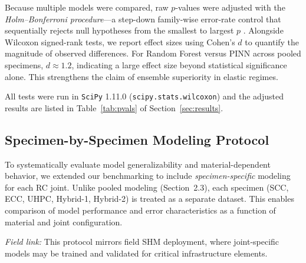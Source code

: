 \documentclass{article}
\begin{document}
Because multiple models were compared, raw $p$-values were adjusted
with the \emph{Holm–Bonferroni procedure}—a step-down family-wise
error-rate control that sequentially rejects null hypotheses from the
smallest to largest $p$ \citep{Holm1979}. Alongside Wilcoxon signed-rank
tests, we report effect sizes using Cohen’s $d$ to quantify the magnitude
of observed differences. For Random Forest versus PINN across pooled
specimens, $d \approx 1.2$, indicating a large effect size beyond
statistical significance alone. This strengthens the claim of ensemble
superiority in elastic regimes. 

All tests were run in
\texttt{SciPy} 1.11.0
(\texttt{scipy.stats.wilcoxon}) and the adjusted results are listed in
Table~\ref{tab:pvals} of Section~\ref{sec:results}.

		

\subsection{Specimen-by-Specimen Modeling Protocol}
To systematically evaluate model generalizability and material-dependent behavior, we extended our benchmarking to include \emph{specimen-specific} modeling for each RC joint. Unlike pooled modeling (Section~2.3), each specimen (SCC, ECC, UHPC, Hybrid-1, Hybrid-2) is treated as a separate dataset. This enables comparison of model performance and error characteristics as a function of material and joint configuration.

\textit{Field link:} This protocol mirrors field SHM deployment, where joint-specific models may be trained and validated for critical infrastructure elements.
\end{document}
